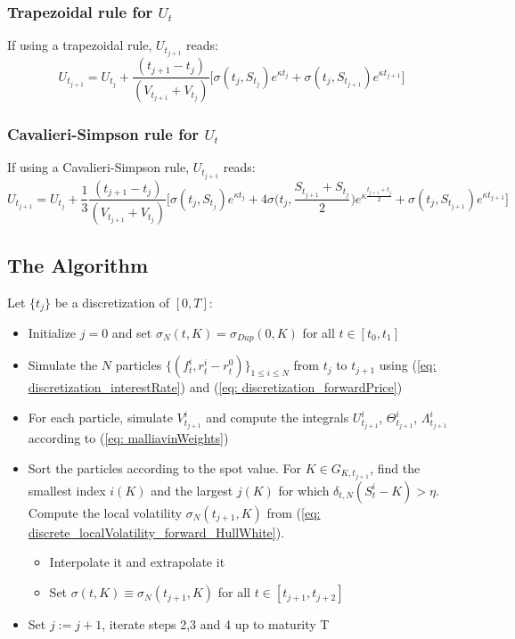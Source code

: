 \subsubsection*{Trapezoidal rule for $U_t$}
If using a trapezoidal rule, $U_{t_{j+1}}$ reads:
$$ U_{t_{j+1}} = U_{t_{j}} +  \frac{(t_{j+1}-t_j)}{(V_{t_{j+1}}+V_{t_{j}})}\big[\sigma(t_j,S_{t_j})e^{\kappa t_j}+ \sigma(t_j,S_{t_{j+1}})e^{\kappa t_{j+1}} \big] $$

\subsubsection*{Cavalieri-Simpson rule for $U_t$}
If using a Cavalieri-Simpson rule, $U_{t_{j+1}}$ reads:
$$ U_{t_{j+1}} = U_{t_{j}} +  \frac{1}{3}\frac{(t_{j+1}-t_j)}{(V_{t_{j+1}}+V_{t_{j}})}\big[\sigma(t_j,S_{t_j})e^{\kappa t_j}+  4\sigma\big(t_j,\frac{S_{t_{j+1}} +S_{t_{j}}}{2}\big)e^{\kappa \frac{t_{j+1}+t_{j}}{2}}   +\sigma(t_j,S_{t_{j+1}})e^{\kappa t_{j+1}} \big] $$
\smallskip

\subsection{The Algorithm}\label{subsec: algorithm}
Let $\{t_j\}$ be a discretization of $[0,T]$:

\begin{itemize}
\item[1.] Initialize $j=0$ and set $\sigma_N(t,K)=\sigma_{Dup}(0,K)$ for all $t\in [t_0,t_1]$
\item[2.] Simulate the $N$ particles  $\{(f_t^i, r_t^i- r^0_t) \}_{1\leq i\leq N}$ from  $t_{j}$ to  $t_{j+1}$ using  (\ref{eq: discretization_interestRate}) and (\ref{eq: discretization_forwardPrice}) 
\item[3.] For each particle, simulate $V_{t_{j+1}}^i$ and compute the integrals $U_{t_{j+1}}^i$, $\Theta_{t_{j+1}}^i$, $\Lambda_{t_{j+1}}^i$ according to (\ref{eq: malliavinWeights})
\item[4.] Sort the particles according to the spot value. For $K\in G_{K,t_{j+1}}$, find the smallest index $i(K)$ and the largest $j(K)$ for which $\delta_{t,N}(S_t^i-K) > \eta$. Compute the local volatility $\sigma_N(t_{j+1},K)$ from (\ref{eq: discrete_localVolatility_forward_HullWhite}).
\begin{itemize}
\item Interpolate it and extrapolate it
\item Set $\sigma(t,K)\equiv \sigma_N(t_{j+1},K)$ for all $t\in [t_{j+1},t_{j+2}]$
\end{itemize}
\item[5.] Set $j:=j+1$, iterate steps 2,3 and 4 up to maturity T
\end{itemize}

